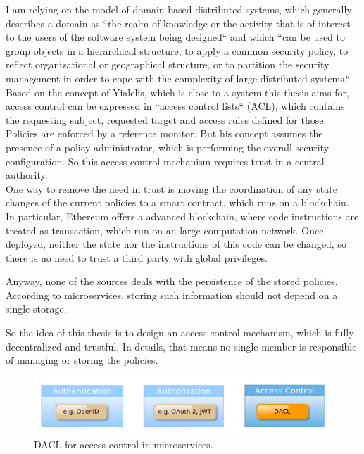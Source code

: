 \documentclass[12pt, conference]{IEEEtran}
\begin{document}
I am relying on the model of domain-based distributed systems, which generally describes a domain as ``the realm of knowledge or the activity that is of interest to the users of the software system being designed`` \cite{b2} and which ``can be used to group
objects in a hierarchical structure, to apply a common security policy, to reflect
organizational or geographical structure, or to partition the security management in order
to cope with the complexity of large distributed systems.`` \cite{b1} Based on the concept of Yialelis, which is close to a system this thesis aims for, access control can be expressed in ``access control lists`` (ACL), which contains the requesting subject, requested target and access rules defined for those. Policies are enforced by a reference monitor. But his concept assumes the presence of a policy administrator, which is performing the overall security configuration. So this access control mechanism requires trust in a central authority. \\

One way to remove the need in trust is moving the coordination of any state changes of the current policies to a smart contract, which runs on a blockchain. In particular, Ethereum offers a advanced blockchain, where code instructions are treated as transaction, which run on an large computation network. Once deployed, neither the state nor the instructions of this code can be changed, so there is no need to trust a third party with global privileges.

Anyway, none of the sources deals with the persistence of the stored policies. According to microservices, storing such information should not depend on a single storage.

So the idea of this thesis is to design an access control mechanism, which is fully decentralized and trustful. In details, that means no single member is responsible of managing or storing the policies.


\begin{figure}[!h]
  \includegraphics[width=\linewidth]{figures/access-control.png}
  \caption{DACL for access control in microservices.}
  \label{fig:access-control}
\end{figure}
\end{document}
